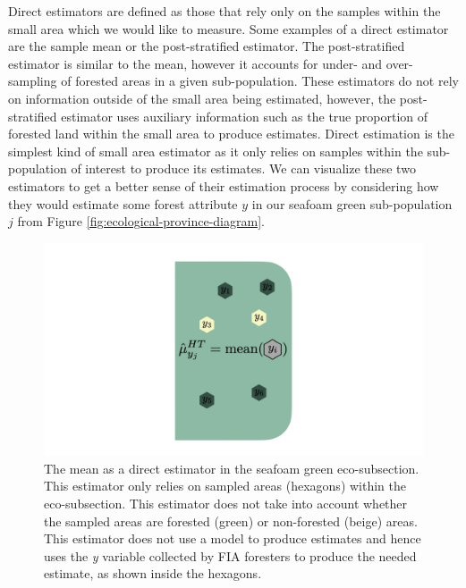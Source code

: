\documentclass[12pt,twoside]{reedthesis}
\begin{document}
Direct estimators are defined as those that rely only on the samples within the small area which we would like to measure. Some examples of a direct estimator are the sample mean or the post-stratified estimator. The post-stratified estimator is similar to the mean, however it accounts for under- and over-sampling of forested areas in a given sub-population. These estimators do not rely on information outside of the small area being estimated, however, the post-stratified estimator uses auxiliary information such as the true proportion of forested land within the small area to produce estimates. Direct estimation is the simplest kind of small area estimator as it only relies on samples within the sub-population of interest to produce its estimates. We can visualize these two estimators to get a better sense of their estimation process by considering how they would estimate some forest attribute \(y\) in our seafoam green sub-population \(j\) from Figure \ref{fig:ecological-province-diagram}.
\begin{figure}

{\centering \includegraphics[width=1\linewidth]{figure/mean-diagram} 

}

\caption[The mean as a direct estimator]{The mean as a direct estimator in the seafoam green eco-subsection. This estimator only relies on sampled areas (hexagons) within the eco-subsection. This estimator does not take into account whether the sampled areas are forested (green) or non-forested (beige) areas. This estimator does not use a model to produce estimates and hence uses the \textit{y} variable collected by FIA foresters to produce the needed estimate, as shown inside the hexagons.}\label{fig:mean-diagram}
\end{figure}
\end{document}
